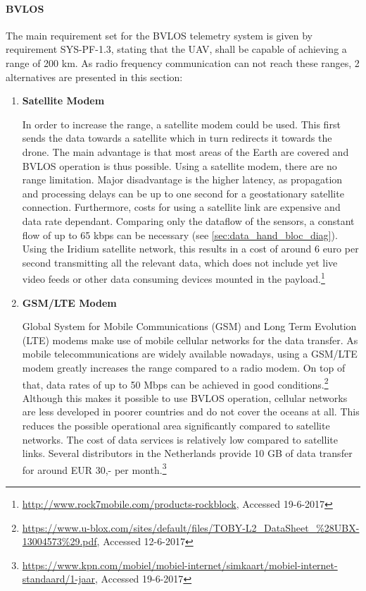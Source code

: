 \paragraph{BVLOS}

The main requirement set for the BVLOS telemetry system is given by requirement SYS-PF-1.3, stating that the UAV, shall be capable of achieving a range of 200 km. As radio frequency communication can not reach these ranges, 2 alternatives are presented in this section: 




\begin{enumerate}
\item{\textbf{Satellite Modem}}

In order to increase the range, a satellite modem could be used. This first sends the data towards a satellite which in turn redirects it towards the drone. The main advantage is that most areas of the Earth are covered and BVLOS operation is thus possible. Using a satellite modem, there are no range limitation. Major disadvantage is the  higher latency, as propagation and processing delays can be up to one second for a geostationary satellite connection. Furthermore, costs for using a satellite link are expensive and data rate dependant. Comparing only the dataflow of the sensors, a constant flow of up to 65 kbps can be necessary (see \autoref{sec:data_hand_bloc_diag}). Using the Iridium satellite network, this results in a cost of around 6 euro per second transmitting all the relevant data, which does not include yet live video feeds or other data consuming devices mounted in the payload.\footnote{\url{http://www.rock7mobile.com/products-rockblock}, Accessed 19-6-2017}

\item{\textbf{GSM/LTE Modem}}

Global System for Mobile Communications (GSM) and Long Term Evolution (LTE) modems make use of mobile cellular networks for the data transfer. As mobile telecommunications are widely available nowadays, using a GSM/LTE modem greatly increases the range compared to a radio modem. On top of that, data rates of up to 50 Mbps can be achieved in good conditions.\footnote{\url{https://www.u-blox.com/sites/default/files/TOBY-L2_DataSheet_\%28UBX-13004573\%29.pdf}, Accessed 12-6-2017} Although this makes it possible to use BVLOS operation, cellular networks are less developed in poorer countries and do not cover the oceans at all. This reduces the possible operational area significantly compared to satellite networks. The cost of data services is relatively low compared to satellite links. Several distributors in the Netherlands provide 10 GB of data transfer for around EUR 30,- per month.\footnote{\url{https://www.kpn.com/mobiel/mobiel-internet/simkaart/mobiel-internet-standaard/1-jaar}, Accessed 19-6-2017} 
\end{enumerate}
